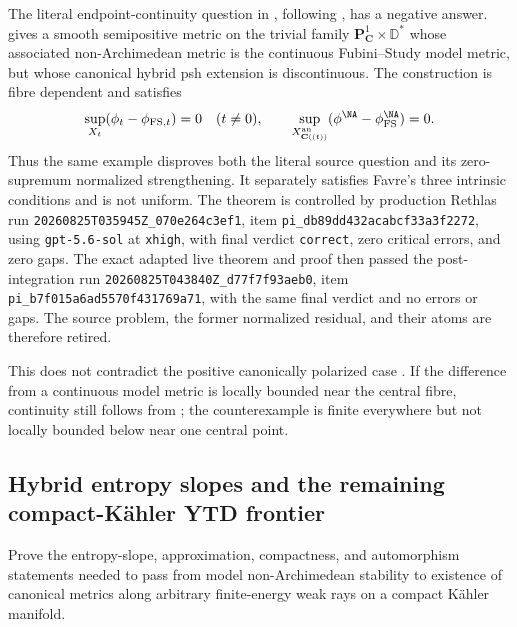 The literal endpoint-continuity question in
\cite[Question~3.18]{PS23Hybrid}, following
\cite[Question~1]{Favre20Hybrid}, has a negative answer.
 gives a smooth
semipositive metric on the trivial family
\(\mathbf P^1_{\mathbf C}\times\mathbb D^*\) whose associated
non-Archimedean metric is the continuous Fubini--Study model metric, but
whose canonical hybrid psh extension is discontinuous.  The construction is
fibre dependent and satisfies
\[
 \sup_{X_t}(\phi_t-\phi_{\mathrm{FS},t})=0
 \quad(t\ne0),
 \qquad
 \sup_{X_{\mathbf C((t))}^{\mathrm{an}}}
 (\phi^{\NA}-\phi_{\mathrm{FS}}^{\NA})=0.
\]
Thus the same example disproves both the literal source question and its
zero-supremum normalized strengthening.  It separately satisfies Favre's
three intrinsic conditions and is not uniform.  The theorem is controlled
by production Rethlas run
\nolinkurl{20260825T035945Z_070e264c3ef1}, item
\nolinkurl{pi_db89dd432acabcf33a3f2272}, using
\texttt{gpt-5.6-sol} at \texttt{xhigh}, with final verdict
\texttt{correct}, zero critical errors, and zero gaps.  The exact adapted
live theorem and proof then passed the post-integration run
\nolinkurl{20260825T043840Z_d77f7f93aeb0}, item
\nolinkurl{pi_b7f015a6ad5570f431769a71}, with the same final verdict and no
errors or gaps.  The source problem,
the former normalized residual, and their atoms are therefore retired.

This does not contradict the positive canonically polarized case
\cite[Theorem~5.1]{PS23Hybrid}.  If the difference from a continuous model
metric is locally bounded near the central fibre, continuity still follows
from ; the counterexample is finite
everywhere but not locally bounded below near one central point.

\subsection{Hybrid entropy slopes and the remaining compact-Kähler YTD frontier}

\begin{problem}\label{prob:frontier-hybrid-ytd}
Prove the entropy-slope, approximation, compactness, and automorphism
statements needed to pass from model non-Archimedean stability to existence
of canonical metrics along arbitrary finite-energy weak rays on a compact
Kähler manifold.
\end{problem}

